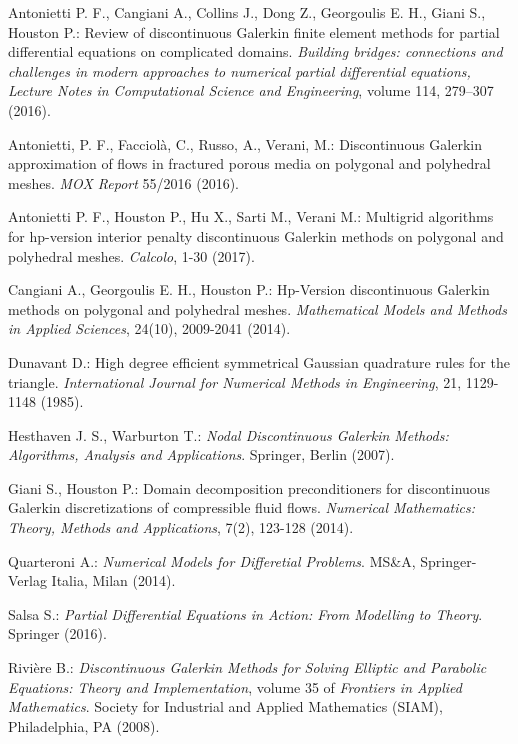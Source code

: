 \documentclass[12pt, a4paper]{article}
\theoremstyle{definition}
\theoremstyle{plain}
\theoremstyle{plain}
\begin{document}
\newpage
\begin{thebibliography}{99}
	Antonietti P. F., Cangiani  A., Collins J., Dong Z., Georgoulis E. H., Giani S., Houston P.: Review of discontinuous Galerkin finite element methods for partial differential equations on complicated domains. \emph{Building bridges: connections and challenges in modern approaches to numerical partial differential equations, Lecture Notes in Computational Science and Engineering}, volume 114, 279–307 (2016).
	
	Antonietti, P. F., Facciolà, C., Russo, A., Verani, M.: Discontinuous Galerkin approximation of flows in fractured porous media on polygonal and polyhedral meshes. \emph{MOX Report} 55/2016 (2016).
	
	Antonietti P. F., Houston  P., Hu  X., Sarti  M., Verani M.: Multigrid algorithms for hp-version interior penalty discontinuous Galerkin methods on polygonal and	polyhedral meshes. \emph{Calcolo}, 1-30 (2017).
	
	Cangiani A., Georgoulis E. H., Houston P.: Hp-Version discontinuous Galerkin methods on polygonal and polyhedral meshes. \emph{Mathematical Models and Methods in Applied Sciences}, 24(10), 2009-2041 (2014).
	
	Dunavant D.: High degree efficient symmetrical Gaussian quadrature rules for the triangle. \emph{International Journal for Numerical Methods in Engineering}, 21, 1129-1148 (1985).
	
	Hesthaven J. S., Warburton T.: \emph{Nodal Discontinuous Galerkin Methods: Algorithms, Analysis and Applications}. Springer, Berlin (2007).
	
	Giani S., Houston P.: Domain decomposition preconditioners for discontinuous Galerkin discretizations of compressible fluid flows. \emph{Numerical Mathematics: Theory, Methods and Applications}, 7(2), 123-128 (2014).
	
	Quarteroni A.: \emph{Numerical Models for Differetial Problems}. MS\&A, Springer-Verlag Italia, Milan (2014).
	
	Salsa S.: \emph{Partial Differential Equations in Action: From Modelling to Theory}. Springer (2016).
	
	Rivière B.: \emph{Discontinuous Galerkin Methods for Solving Elliptic and Parabolic Equations: Theory and Implementation}, volume 35 of \emph{Frontiers in Applied Mathematics}. Society for Industrial and Applied Mathematics (SIAM), Philadelphia, PA (2008).
\end{thebibliography}
\end{document}
